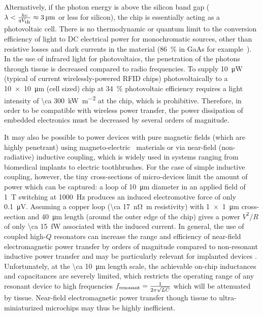 Alternatively, if the photon energy is above the silicon band gap ($\lambda < \frac{h c}{qV_{\text{\scriptsize th}}} \approx \SI{3}{\micro\meter}$ or less for silicon), the chip is essentially acting as a photovoltaic cell.
There is no thermodynamic or quantum limit to the conversion efficiency of light to DC electrical power for monochromatic sources, other than resistive losses and dark currents in the material (\SI{86}{\percent} in GaAs for example~\cite{bett08}). 
In the use of infrared light for photovoltaics, the penetration of the photons through tissue is decreased compared to radio frequencies.
To supply \SI{10}{\micro\watt} (typical of current wirelessly-powered RFID chips) photovoltaically to a \SI{10 x 10}{\micro\meter} (cell sized) chip at \SI{34}{\percent} photovoltaic efficiency requires a light intensity of \SI{\ca 300}{\kilo\watt\per\meter\squared} at the chip, which is prohibitive.
Therefore, in order to be compatible with wireless power transfer, the power dissipation of embedded electronics must be decreased by several orders of magnitude.

It may also be possible to power devices with pure magnetic fields (which are highly penetrant) using magneto-electric~\cite{Kitagawa2010, Priya2009, Yue2012, Fiebig2005} materials or via near-field (non-radiative) inductive coupling, which is widely used in systems ranging from biomedical implants to electric toothbrushes. For the case of simple inductive coupling, however, the tiny cross-sections of micro-devices limit the amount of power which can be captured: a loop of \SI{10}{\micro\meter} diameter in an applied field of \SI{1}{\tesla} switching at \SI{1000}{\hertz} produces an induced electromotive force of only \SI{0.1}{\micro\volt}. Assuming a copper loop (\SI{\ca 17}{\nano\ohm\meter} resistivity) with \SI{1 x 1}{\micro\meter} cross-section and \SI{40}{\micro\meter} length (around the outer edge of the chip) gives a power $V^2/R$ of only \SI{\ca 15}{\femto\watt} associated with the induced current. In general, the use of coupled high-$Q$ resonators can increase the range and efficiency of near-field electromagnetic power transfer by orders of magnitude \cite{Karalis2008} compared to non-resonant inductive power transfer and may be particularly relevant for implanted devices \cite{Ho2013}. Unfortunately, at the \SI{\ca 10}{\micro\meter} length scale, the achievable on-chip inductances and capacitances are severely limited, which restricts the operating range of any resonant device to high frequencies $f_{\text{\scriptsize resonant}} = \frac{1}{2\pi\sqrt{LC}}$ which will be attenuated by tissue. Near-field electromagnetic power transfer though tissue to ultra-miniaturized microchips may thus be highly inefficient.

